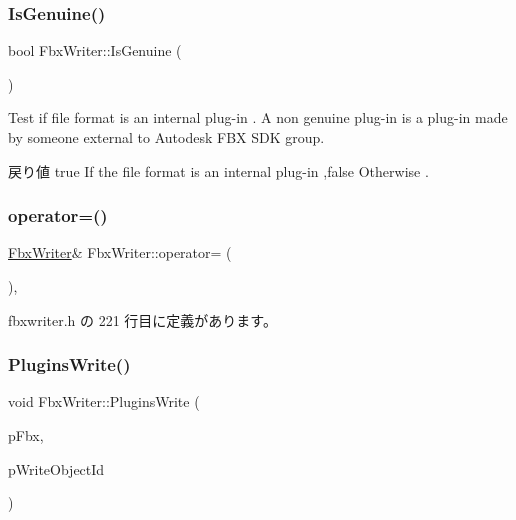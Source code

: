 \mbox{\label{class_fbx_writer_a030c374bcc699993ea32225a4624532a}} 
\subsubsection{\texorpdfstring{Is\+Genuine()}{IsGenuine()}}
{\footnotesize\ttfamily bool Fbx\+Writer\+::\+Is\+Genuine (\begin{DoxyParamCaption}{ }\end{DoxyParamCaption})}

Test if file format is an internal plug-\/in . A non genuine plug-\/in is a plug-\/in made by someone external to Autodesk F\+BX S\+DK group. \begin{DoxyReturn}{戻り値}
{\ttfamily true} If the file format is an internal plug-\/in ,{\ttfamily false} Otherwise . 
\end{DoxyReturn}
\mbox{\label{class_fbx_writer_a7f56d9a174cfde0ab7815135b2c5f3c1}} 
\subsubsection{\texorpdfstring{operator=()}{operator=()}}
{\footnotesize\ttfamily \hyperlink{class_fbx_writer}{Fbx\+Writer}\& Fbx\+Writer\+::operator= (\begin{DoxyParamCaption}\item[{\hyperlink{class_fbx_writer}{Fbx\+Writer} const \&}]{ }\end{DoxyParamCaption})\hspace{0.3cm}{\ttfamily [inline]}, {\ttfamily [protected]}}



 fbxwriter.\+h の 221 行目に定義があります。

\mbox{\label{class_fbx_writer_aeca3bf711e9fb1815c90b3423773010d}} 
\subsubsection{\texorpdfstring{Plugins\+Write()}{PluginsWrite()}}
{\footnotesize\ttfamily void Fbx\+Writer\+::\+Plugins\+Write (\begin{DoxyParamCaption}\item[{\hyperlink{class_fbx_i_o}{Fbx\+IO} \&}]{p\+Fbx,  }\item[{bool}]{p\+Write\+Object\+Id }\end{DoxyParamCaption})\hspace{0.3cm}{\ttfamily [protected]}}

